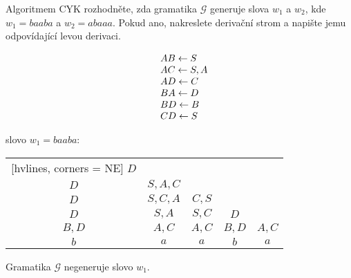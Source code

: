 Algoritmem CYK rozhodněte, zda gramatika $\mathcal{G}$ generuje slova $w_1$ a $w_2$, kde $w_1 = baaba$ a $w_2 = abaaa$.
 Pokud ano, nakreslete derivační strom a napište jemu odpovídající levou derivaci.


\begin{minipage}{0.5\textwidth}
    

\[
    \begin{array}{l l}
    & AB \leftarrow S \\
    & AC \leftarrow S, A \\
    & AD \leftarrow C \\
    & BA \leftarrow D \\
    & BD \leftarrow B \\ 
    & CD \leftarrow S \\ 
    \end{array}
\]
\end{minipage}\begin{minipage}{0.5\textwidth}
    
slovo $w_1 = baaba$: 

\vspace*{2mm}

\begin{NiceTabular}{ccccc}[hvlines, corners = NE] %
    $D$ &  &   &   &   \\ 
    $D$ & $S, A, C$ &  &   &   \\ 
    $D$ & $S, C, A$ & $C, S$ &  &  \\ 
    $D$ & $S, A$ & $S, C$ & $D$ &  \\ 
    $B, D$ & $A,C$ & $A,C$ & $B, D$ & $A, C$ \\ 
    $b$ & $a$ & $a$ & $b$ & $a$ \\ 
\end{NiceTabular}

    
\vspace*{2mm}
    Gramatika $\mathcal{G}$ negeneruje slovo $w_1$. 

\end{minipage}


